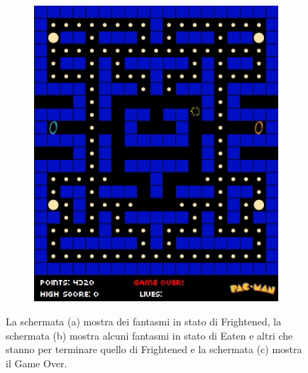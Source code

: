 \documentclass[12pt,a4paper]{report}
\begin{document}
\begin{figure}[hb!]
\begin{subfigure}{.32\textwidth}
  \caption{}
  \label{fig:snap2}
\end{subfigure}%
\begin{subfigure}{.32\textwidth}
  \centering
  \includegraphics[width=.95\linewidth]{gameover}
  \caption{}
  \label{fig:snap3}
\end{subfigure}
\caption{La schermata (a) mostra dei fantasmi in stato di Frightened, la schermata (b) mostra alcuni fantasmi in stato di Eaten e altri che stanno per terminare quello di Frightened e la schermata (c) mostra il Game Over.}
\label{fig:fig}
\end{figure}
\end{document}
